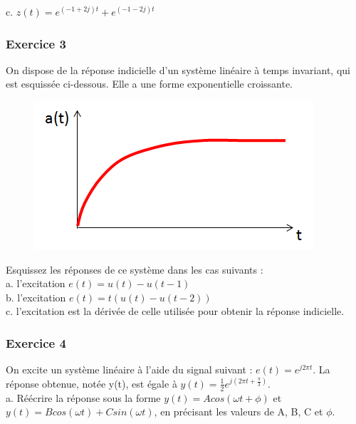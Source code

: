	c. $z(t) = e^{(-1+2j)t}+e^{(-1-2j)t}$
	
	\vspace{1\baselineskip} 
	
	
	
	\subsubsection{Exercice 3}
	
	On dispose de la réponse indicielle d'un système linéaire à temps invariant, qui est esquissée ci-dessous. Elle a une forme exponentielle croissante.\\
	
	\begin{figure}[h!]
		\centering
		\includegraphics[scale=0.5]{images/Exo_2_3.png} 
	\end{figure} 
	
	Esquissez les réponses de ce système dans les cas suivants :\\
	
	a. l'excitation $e(t)=u(t)-u(t-1)$\\
	
	b. l'excitation $e(t)=t(u(t)-u(t-2))$\\
	
	c. l'excitation est la dérivée de celle utilisée pour obtenir la réponse indicielle.\\
	
	\subsubsection{Exercice 4}
	
	On excite un système linéaire à l'aide du signal suivant : $e(t)=e^{j2\pi t}$. La réponse obtenue, notée y(t), est égale à $y(t)=\frac{1}{2}e^{j(2\pi t+\frac{\pi}{3})}$.\\
	
	a. Réécrire la réponse sous la forme $y(t)=Acos(\omega t + \phi)$ et $y(t)=Bcos(\omega t)+Csin(\omega t)$, en précisant les valeurs de A, B, C et $\phi$.\\
	
